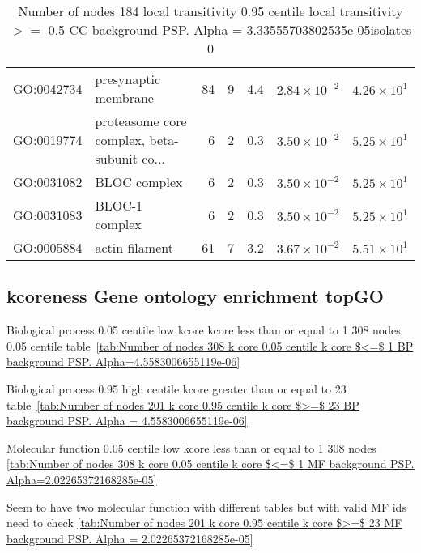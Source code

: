 \begin{table}[ht]
\begin{adjustbox}{max width=\textwidth}
\begin{tabular}{llrrrrr}
  GO:0042734 & presynaptic membrane & 84 & 9 & 4.4 & $2.84 \times 10^{-2}$ & $4.26 \times 10^{1}$ \\ 
  GO:0019774 & proteasome core complex, beta-subunit co... & 6 & 2 & 0.3 & $3.50 \times 10^{-2}$ & $5.25 \times 10^{1}$ \\ 
  GO:0031082 & BLOC complex & 6 & 2 & 0.3 & $3.50 \times 10^{-2}$ & $5.25 \times 10^{1}$ \\ 
  GO:0031083 & BLOC-1 complex & 6 & 2 & 0.3 & $3.50 \times 10^{-2}$ & $5.25 \times 10^{1}$ \\ 
  GO:0005884 & actin filament & 61 & 7 & 3.2 & $3.67 \times 10^{-2}$ & $5.51 \times 10^{1}$ \\ 
   \hline
\end{tabular}
\end{adjustbox}
\caption{Number of nodes 184 local transitivity 0.95 centile  local transitivity $>=$ 0.5 CC background PSP. Alpha = 3.33555703802535e-05isolates 0} 
\label{tab:Number of nodes 184 local transitivity 0.95 centile  local transitivity $>=$ 0.5 CC background PSP. Alpha = 3.33555703802535e-05isolates 0}
\end{table}

\subsection{kcoreness Gene ontology enrichment topGO}

Biological process 0.05 centile low kcore kcore less than or equal to 1 308 nodes 0.05 centile table~\ref{tab:Number of nodes 308 k core 0.05 centile  k core $<=$ 1 BP background PSP. Alpha=4.5583006655119e-06}

Biological process 0.95 high centile kcore greater than or equal to 23 table~\ref{tab:Number of nodes 201 k core 0.95 centile  k core $>=$ 23 BP background PSP. Alpha = 4.5583006655119e-06}

Molecular function 0.05 centile low kcore less than or equal to 1 308 nodes \ref{tab:Number of nodes 308 k core 0.05 centile  k core $<=$ 1 MF background PSP. Alpha=2.02265372168285e-05}

Seem to have two molecular function with different tables but with valid MF ids need to check
\ref{tab:Number of nodes 201 k core 0.95 centile  k core $>=$ 23 MF background PSP. Alpha = 2.02265372168285e-05}




